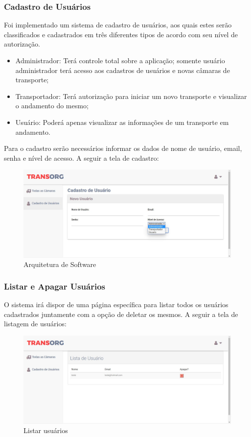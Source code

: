 \subsubsection{Cadastro de Usuários}
	Foi implementado um sistema de cadastro de usuários, aos quais estes serão classificados e cadastrados em três diferentes tipos de acordo com seu nível de autorização.

\begin{itemize}
\item Administrador: Terá controle total sobre a aplicação; somente usuário administrador terá acesso aos cadastros de usuários e novas câmaras de transporte;
\item Transportador:  Terá autorização para iniciar um novo transporte e visualizar o andamento do mesmo;
\item Usuário: Poderá apenas visualizar as informações de um transporte em andamento.
\end{itemize}

	Para o cadastro serão necessários informar os dados de nome de usuário, email, senha e nível de acesso. A seguir a tela de cadastro:

\begin{figure}[H]
\centering
\includegraphics[width=16cm]{figuras/cadastro_software.JPG}
\caption{Arquitetura de Software}
\end{figure}

\subsubsection{Listar e Apagar Usuários}
	O sistema irá dispor de uma página específica para listar todos os usuários cadastrados juntamente com a opção de deletar os mesmos. A seguir a tela de listagem de usuários:

\begin{figure}[H]
\centering
\includegraphics[width=16cm]{figuras/listaUsuarios_software.JPG}
\caption{Listar usuários}
\end{figure}

